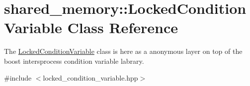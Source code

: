 \hypertarget{classshared__memory_1_1LockedConditionVariable}{}\section{shared\+\_\+memory\+:\+:Locked\+Condition\+Variable Class Reference}
\label{classshared__memory_1_1LockedConditionVariable}


The \hyperlink{classshared__memory_1_1LockedConditionVariable}{Locked\+Condition\+Variable} class is here as a anonymous layer on top of the boost intersprocess condition variable labrary.  




{\ttfamily \#include $<$locked\+\_\+condition\+\_\+variable.\+hpp$>$}

